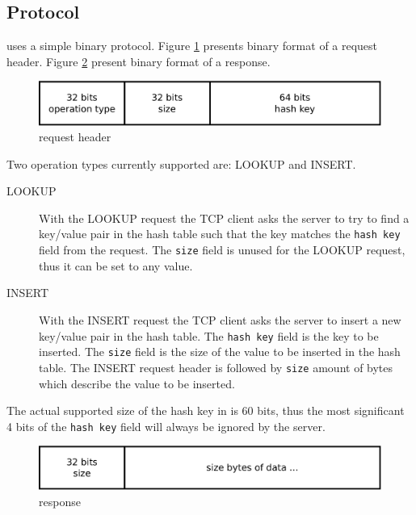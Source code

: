 \subsection{Protocol}

\cpserver{} uses a simple binary protocol. Figure \ref{fig:protocolrequest} presents binary format of a request header.
Figure \ref{fig:protocolresponse} present binary format of a response.

\begin{figure}[!ht]
  \centering
  \includegraphics[width=\linewidth]{figs/protocolrequest.pdf}
  \caption{\cpserver{} request header}
  \label{fig:protocolrequest}
\end{figure}

Two operation types currently supported are: LOOKUP and INSERT.
\begin{description}
\item[LOOKUP] With the LOOKUP request the TCP client asks the server to try to find a key/value pair in the hash table
such that the key matches the \texttt{hash key} field from the request. The \texttt{size} field is unused for the LOOKUP request,
thus it can be set to any value.
\item[INSERT] With the INSERT request the TCP client asks the server to insert a new key/value pair in the hash table. 
The \texttt{hash key} field is the key to be inserted. The \texttt{size} field is the size of the value to be inserted in the hash table.
The INSERT request header is followed by \texttt{size} amount of bytes which describe the value to be inserted.
\end{description}

The actual supported size of the hash key in \cphash{} is 60 bits, thus the most significant 
4 bits of the \texttt{hash key} field will always be ignored by the server.

\begin{figure}[!ht]
  \centering
  \includegraphics[width=\linewidth]{figs/protocolresponse.pdf}
  \caption{\cpserver{} response}
  \label{fig:protocolresponse}
\end{figure}


